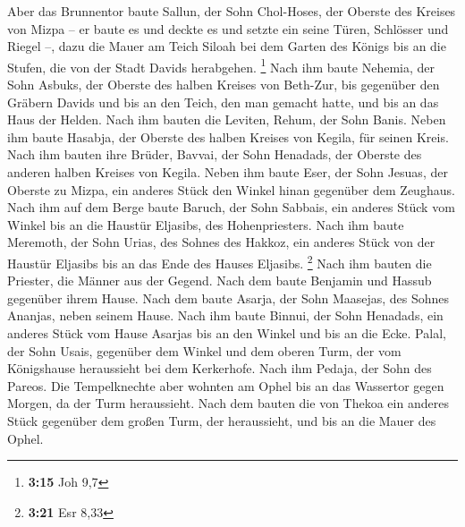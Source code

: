  Aber das Brunnentor baute Sallun, der Sohn Chol-Hoses,
der Oberste des Kreises von Mizpa -- er baute es und deckte es und
setzte ein seine Türen, Schlösser und Riegel --, dazu die Mauer am Teich
Siloah bei dem Garten des Königs bis an die Stufen, die von der Stadt
Davids herabgehen. \footnote{\textbf{3:15} Joh 9,7}  Nach
ihm baute Nehemia, der Sohn Asbuks, der Oberste des halben Kreises von
Beth-Zur, bis gegenüber den Gräbern Davids und bis an den Teich, den man
gemacht hatte, und bis an das Haus der Helden.  Nach ihm
bauten die Leviten, Rehum, der Sohn Banis. Neben ihm baute Hasabja, der
Oberste des halben Kreises von Kegila, für seinen Kreis. 
Nach ihm bauten ihre Brüder, Bavvai, der Sohn Henadads, der Oberste des
anderen halben Kreises von Kegila.  Neben ihm baute Eser,
der Sohn Jesuas, der Oberste zu Mizpa, ein anderes Stück den Winkel
hinan gegenüber dem Zeughaus.  Nach ihm auf dem Berge
baute Baruch, der Sohn Sabbais, ein anderes Stück vom Winkel bis an die
Haustür Eljasibs, des Hohenpriesters.  Nach ihm baute
Meremoth, der Sohn Urias, des Sohnes des Hakkoz, ein anderes Stück von
der Haustür Eljasibs bis an das Ende des Hauses Eljasibs. \footnote{\textbf{3:21}
  Esr 8,33}  Nach ihm bauten die Priester, die Männer aus
der Gegend.  Nach dem baute Benjamin und Hassub gegenüber
ihrem Hause. Nach dem baute Asarja, der Sohn Maasejas, des Sohnes
Ananjas, neben seinem Hause.  Nach ihm baute Binnui, der
Sohn Henadads, ein anderes Stück vom Hause Asarjas bis an den Winkel und
bis an die Ecke.  Palal, der Sohn Usais, gegenüber dem
Winkel und dem oberen Turm, der vom Königshause heraussieht bei dem
Kerkerhofe. Nach ihm Pedaja, der Sohn des Pareos.  Die
Tempelknechte aber wohnten am Ophel bis an das Wassertor gegen Morgen,
da der Turm heraussieht.  Nach dem bauten die von Thekoa
ein anderes Stück gegenüber dem großen Turm, der heraussieht, und bis an
die Mauer des Ophel.

